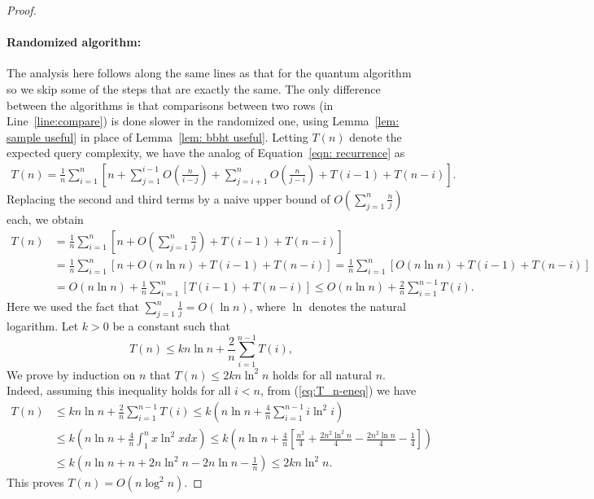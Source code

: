 \documentclass[11pt]{article}
\begin{document}
\begin{proof}
    \paragraph*{Randomized algorithm:} The analysis here follows along the same lines as that for the quantum algorithm so we skip some of the steps that are exactly the same. The only difference between the algorithms is that comparisons between two rows (in Line~\ref{line:compare}) is done slower in the randomized one, using Lemma~\ref{lem: sample useful} in place of Lemma~\ref{lem: bbht useful}. Letting $T(n)$ denote the expected query complexity, we have the analog of Equation~\eqref{eqn: recurrence} as
    \begin{align*}
        T(n) = \frac{1}{n}\sum_{i = 1}^n\left[n + \sum_{j = 1}^{i - 1}O\left(\frac{n}{i - j}\right) + \sum_{j = i + 1}^nO\left(\frac{n}{j - i}\right) + T(i - 1) + T(n - i)\right].
    \end{align*}
    Replacing the second and third terms by a naive upper bound of $O\left(\sum_{j = 1}^n \frac{n}{j}\right)$ each, we obtain
        \begin{align*}
        T(n) & = \frac{1}{n}\sum_{i = 1}^n\left[n + O\left(\sum_{j = 1}^{n}\frac{n}{j}\right) + T(i - 1) + T(n - i)\right]\\
        & = \frac{1}{n}\sum_{i = 1}^n\left[n + O(n \ln n) + T(i - 1) + T(n - i)\right] = \frac{1}{n}\sum_{i = 1}^n\left[O(n \ln n) + T(i - 1) + T(n - i) \right]\\
        & = O(n \ln n) + \frac1n \sum_{i = 1}^n [T(i - 1) + T(n - i)] \leq O(n \ln n) + \frac{2}{n} \sum_{i = 1}^{n - 1} T(i).
    \end{align*}
    Here we used the fact that $\sum_{j = 1}^n \frac1j = O(\ln n)$, where $\ln$ denotes the natural logarithm. Let $k > 0$ be a constant such that
    \begin{equation}\label{eq:T_n-eneq}
        T(n) \leq kn \ln n + \frac{2}{n} \sum_{i = 1}^{n - 1} T(i),                    
    \end{equation}
    We prove by induction on $n$ that $T(n) \leq 2k n\ln^2 n$ holds for all natural $n$.
    Indeed, assuming this inequality holds for all $i < n$, from (\ref{eq:T_n-eneq}) we have 
    \begin{align*}
        T(n) & \leq kn \ln n + \frac{2}{n} \sum_{i = 1}^{n - 1} T(i) \leq k \left( n \ln n + \frac4n \sum_{i = 1}^{n - 1} i \ln^2 i \right) \\
        & \leq k \left( n \ln n + \frac4n \int_{1}^n x \ln^2 x dx \right) \leq k \left( n\ln n + \frac4n \left[\frac{n^2}{4} + \frac{2n^2 \ln^2 n}{4} - \frac{2n^2 \ln n}{4} - \frac14\right] \right)\\
        & \leq k\left( n\ln n + n + 2n \ln^2 n - 2n \ln n - \frac{1}{n} \right) \leq 2kn \ln^2 n.
    \end{align*}
    This proves $T(n) = O(n \log^2 n)$.
\end{proof}
\end{document}
